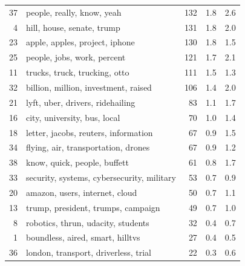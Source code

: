 \begin{table}[H]
\begin{tabular}[t]{r>{\raggedright\arraybackslash}p{3.8cm}rrr}
37 & people, really, know, yeah & 132 & 1.8 & 2.6\\
4 & hill, house, senate, trump & 131 & 1.8 & 2.0\\
23 & apple, apples, project, iphone & 130 & 1.8 & 1.5\\
25 & people, jobs, work, percent & 121 & 1.7 & 2.1\\
11 & trucks, truck, trucking, otto & 111 & 1.5 & 1.3\\
32 & billion, million, investment, raised & 106 & 1.4 & 2.0\\
21 & lyft, uber, drivers, ridehailing & 83 & 1.1 & 1.7\\
16 & city, university, bus, local & 70 & 1.0 & 1.4\\
18 & letter, jacobs, reuters, information & 67 & 0.9 & 1.5\\
34 & flying, air, transportation, drones & 67 & 0.9 & 1.2\\
38 & know, quick, people, buffett & 61 & 0.8 & 1.7\\
33 & security, systems, cybersecurity, military & 53 & 0.7 & 0.9\\
20 & amazon, users, internet, cloud & 50 & 0.7 & 1.1\\
13 & trump, president, trumps, campaign & 49 & 0.7 & 1.0\\
8 & robotics, thrun, udacity, students & 32 & 0.4 & 0.7\\
1 & boundless, aired, smart, hilltvs & 27 & 0.4 & 0.5\\
36 & london, transport, driverless, trial & 22 & 0.3 & 0.6\\
\bottomrule
\end{tabular}
\end{table}
